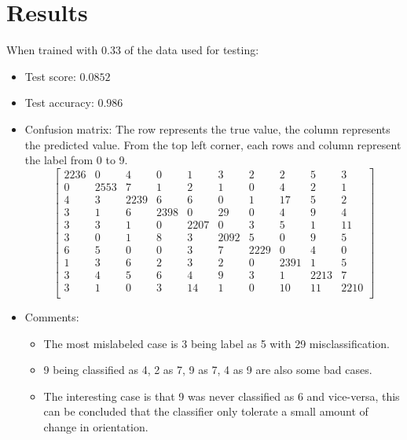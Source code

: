 \documentclass[paper=a4, fontsize=11pt]{scrartcl} %
\begin{document}
\section{Results}
    When trained with 0.33 of the data used for testing:
    \begin{itemize}
        \item Test score: $0.0852$
        \item Test accuracy: $0.986$
        \item Confusion matrix: The row represents the true value, the column represents the predicted value. From the top left corner, each rows and column represent the label from 0 to 9.
        \[ \left[ \begin{array}{cccccccccc}
        2236 &    0 &    4 &    0 &    1 &    3 &    2 &    2 &    5 &    3 \\
           0 & 2553 &    7 &    1 &    2 &    1 &    0 &    4 &    2 &    1 \\
           4 &    3 & 2239 &    6 &    6 &    0 &    1 &   17 &    5 &    2 \\
           3 &    1 &    6 & 2398 &    0 &   29 &    0 &    4 &    9 &    4 \\
           3 &    3 &    1 &    0 & 2207 &    0 &    3 &    5 &    1 &   11 \\
           3 &    0 &    1 &    8 &    3 & 2092 &    5 &    0 &    9 &    5 \\
           6 &    5 &    0 &    0 &    3 &    7 & 2229 &    0 &    4 &    0 \\
           1 &    3 &    6 &    2 &    3 &    2 &    0 & 2391 &    1 &    5 \\
           3 &    4 &    5 &    6 &    4 &    9 &    3 &    1 & 2213 &    7 \\
           3 &    1 &    0 &    3 &   14 &    1 &    0 &   10 &   11 & 2210 \\
        \end{array} \right] \]
        \item Comments:
        \begin{itemize}
            \item The most mislabeled case is 3 being label as 5 with 29 misclassification.
            \item 9 being classified as 4, 2 as 7, 9 as 7, 4 as 9 are also some bad cases.
            \item The interesting case is that 9 was never classified as 6 and vice-versa, this can be concluded that the classifier only tolerate a small amount of change in orientation.
        \end{itemize}
    \end{itemize}
\end{document}

